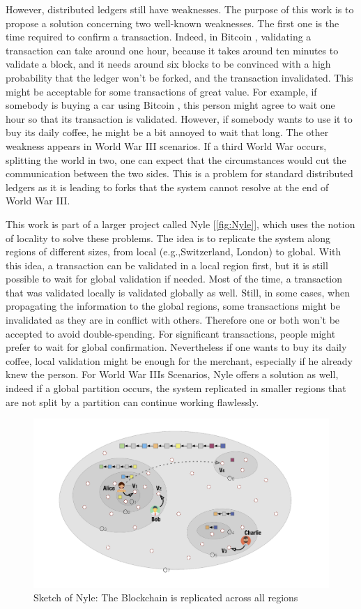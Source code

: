 \documentclass[a4paper,11pt,twoside,openright]{report}
\begin{document}
However, distributed ledgers still have weaknesses. The purpose of this
work is to propose a solution concerning two well-known weaknesses. The first
one is the time required to confirm a transaction. Indeed, in Bitcoin
\cite{Nakamoto2009}, validating a transaction can take around one hour, because
it takes around ten minutes to validate a block, and it needs around six blocks
to be convinced with a high probability that the ledger won't be forked, and
the transaction invalidated. This might be acceptable for some transactions of great
value. For example, if somebody is buying a car using Bitcoin
\cite{Nakamoto2009}, this person might agree to wait one hour so that its
transaction is validated. However, if somebody wants to use it to buy its daily
coffee, he might be a bit annoyed to wait that long. The other weakness
appears in World War III scenarios. If a third World War occurs, splitting the
world in two, one can expect that the circumstances would cut the communication between the two sides. This is a problem for standard distributed ledgers as it is leading to
forks that the system cannot resolve at the end of World War III.

 This work is part of
a larger project called Nyle [\autoref{fig:Nyle}], which uses the notion of
locality to solve these problems. The idea is to replicate the system along
regions of different sizes, from local (e.g.,Switzerland, London) to global.
With this idea, a transaction can be validated in a local region first, but it
is still possible to wait for global validation if needed. Most of the time, a
transaction that was validated locally is validated globally as well. Still, in some cases, when propagating the information to the global regions, some
transactions might be invalidated as they are in conflict with others. Therefore one or both won't be accepted to avoid double-spending. For significant
transactions, people might prefer to wait for global confirmation. Nevertheless if one
wants to buy its daily coffee, local validation might be enough for the
merchant, especially if he already knew the person. For World War IIIs
Scenarios, Nyle offers a solution as well, indeed if a global partition occurs,
the system replicated in smaller regions that are not split
by a partition can continue working flawlessly. 

\begin{figure}[!h]
\centering
\includegraphics[width=400pt]{figures/Nyle}
\caption{Sketch of Nyle: The Blockchain is replicated across all regions}
\label{fig:Nyle}
\end{figure}
\end{document}
